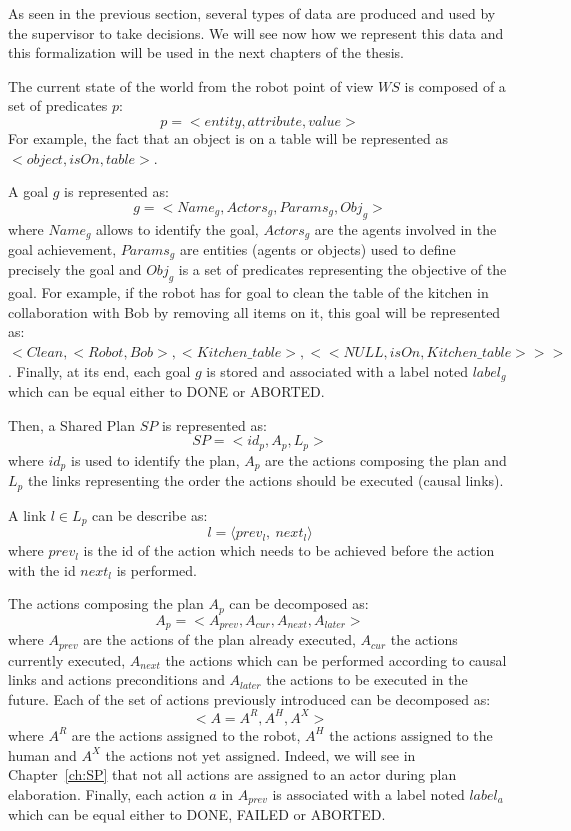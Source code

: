 \documentclass[english,a4paper,11pt,twoside]{StyleThese}
\begin{document}
\label{sec:data}

As seen in the previous section, several types of data are produced and used by the supervisor to take decisions. We will see now how we represent this data and this formalization will be used in the next chapters of the thesis.

The current state of the world from the robot point of view $WS$ is composed of a set of predicates $p$:
$$p = <entity, attribute, value>$$
For example, the fact that an object is on a table will be represented as $<object, isOn, table>$.

A goal $g$ is represented as:
$$g = <Name_g, Actors_g, Params_g, Obj_g>$$
where $Name_g$ allows to identify the goal, $Actors_g$ are the agents involved in the goal achievement, $Params_g$ are entities  (agents or objects) used to define precisely the goal and $Obj_g$ is a set of predicates representing the objective of the goal.
For example, if the robot has for goal to clean the table of the kitchen in collaboration with Bob by removing all items on it, this goal will be represented as:
$<Clean, <Robot, Bob>, <Kitchen\_table>, <<NULL, isOn, Kitchen\_table>>>$.
Finally, at its end, each goal $g$ is stored and associated with a label noted $label_g$ which can be equal either to DONE or ABORTED.

Then, a Shared Plan $SP$ is represented as:
$$SP = <id_p, A_p, L_p>$$
where $id_p$ is used to identify the plan, $A_p$ are the actions composing the plan and $L_p$ the links representing the order the actions should be executed (causal links).

A link $l \in L_p$ can be describe as:
 $$l = \langle prev_l, \ next_l \rangle$$
where $prev_l$ is the id of the action which needs to be achieved before the action with the id $next_l$ is performed. 

The actions composing the plan $A_p$ can be decomposed as:
$$A_p = <A_{prev}, A_{cur}, A_{next}, A_{later}>$$
where $A_{prev}$ are the actions of the plan already executed, $A_{cur}$ the actions currently executed, $A_{next}$ the actions which can be performed according to causal links and actions preconditions and $A_{later}$ the actions to be executed in the future.
Each of the set of actions previously introduced can be decomposed as:
$$<A = A^R, A^H, A^X>$$
where $A^R$ are the actions assigned to the robot, $A^H$ the actions assigned to the human and $A^X$ the actions not yet assigned. Indeed, we will see in Chapter~\ref{ch:SP} that not all actions are assigned to an actor during plan elaboration.
Finally, each action $a$ in $A_{prev}$ is associated with a label noted $label_a$ which can be equal either to DONE, FAILED or ABORTED.
\end{document}
